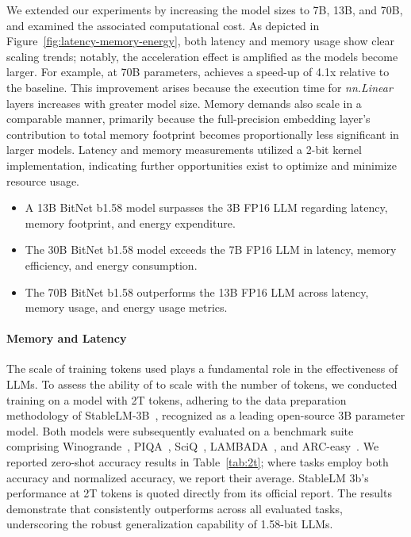 We extended our experiments by increasing the model sizes to 7B, 13B, and 70B, and examined the associated computational cost. As depicted in Figure~\ref{fig:latency-memory-energy}, both latency and memory usage show clear scaling trends; notably, the acceleration effect is amplified as the models become larger. For example, at 70B parameters,  achieves a speed-up of 4.1x relative to the  baseline. This improvement arises because the execution time for \emph{nn.Linear} layers increases with greater model size. Memory demands also scale in a comparable manner, primarily because the full-precision embedding layer's contribution to total memory footprint becomes proportionally less significant in larger models. Latency and memory measurements utilized a 2-bit kernel implementation, indicating further opportunities exist to optimize and minimize resource usage.

\begin{itemize}
    \item A 13B BitNet b1.58 model surpasses the 3B FP16 LLM regarding latency, memory footprint, and energy expenditure.
    \item The 30B BitNet b1.58 model exceeds the 7B FP16 LLM in latency, memory efficiency, and energy consumption.
    \item The 70B BitNet b1.58 outperforms the 13B FP16 LLM across latency, memory usage, and energy usage metrics.
\end{itemize}

\paragraph{Memory and Latency}

The scale of training tokens used plays a fundamental role in the effectiveness of LLMs. To assess the ability of  to scale with the number of tokens, we conducted training on a  model with 2T tokens, adhering to the data preparation methodology of StableLM-3B~\cite{StableLM-3B-4E1T}, recognized as a leading open-source 3B parameter model. Both models were subsequently evaluated on a benchmark suite comprising Winogrande~\cite{winoGrande}, PIQA~\cite{piqa}, SciQ~\cite{sciq}, LAMBADA~\cite{lambada}, and ARC-easy~\cite{arc}. We reported zero-shot accuracy results in Table~\ref{tab:2t}; where tasks employ both accuracy and normalized accuracy, we report their average. StableLM 3b’s performance at 2T tokens is quoted directly from its official report. The results demonstrate that  consistently outperforms across all evaluated tasks, underscoring the robust generalization capability of 1.58-bit LLMs.

